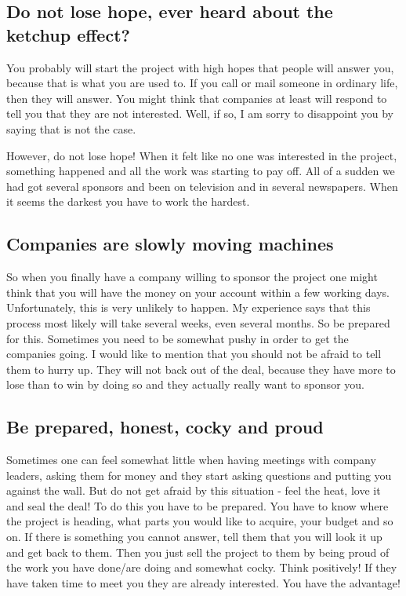 \subsection{Do not lose hope, ever heard about the ketchup effect?}
You probably will start the project with high hopes that people will answer you, because that is what you are used to. If you call or mail someone in ordinary life, then they will answer. You might think that companies at least will respond to tell you that they are not interested. Well, if so, I am sorry to disappoint you by saying that is not the case.

However, do not lose hope! When it felt like no one was interested in the project, something happened and all the work was starting to pay off. All of a sudden we had got several sponsors and been on television and in several newspapers. When it seems the darkest you have to work the hardest.

\subsection{Companies are slowly moving machines}
So when you finally have a company willing to sponsor the project one might think that you will have the money on your account within a few working days. Unfortunately, this is very unlikely to happen. My experience says that this process most likely will take several weeks, even several months. So be prepared for this. Sometimes you need to be somewhat pushy in order to get the companies going. I would like to mention that you should not be afraid to tell them to hurry up. They will not back out of the deal, because they have more to lose than to win by doing so and they actually really want to sponsor you.
\pagebreak
\subsection{Be prepared, honest, cocky and proud}
Sometimes one can feel somewhat little when having meetings with company leaders, asking them for money and they start asking questions and putting you against the wall. But do not get afraid by this situation - feel the heat, love it and seal the deal! To do this you have to be prepared. You have to know where the project is heading, what parts you would like to acquire, your budget and so on. If there is something you cannot answer, tell them that you will look it up and get back to them. Then you just sell the project to them by being proud of the work you have done/are doing and somewhat cocky.  Think positively! If they have taken time to meet you they are already interested. You have the advantage!


